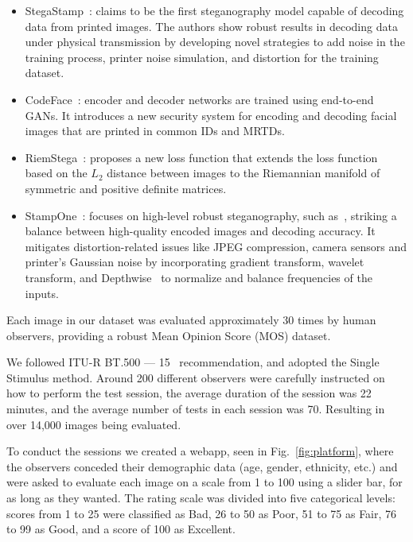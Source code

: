 \begin{itemize}
    \item StegaStamp~\cite{stegastamp2020}: claims to be the first steganography model capable of decoding data from printed images. The authors show robust results in decoding data under physical transmission by developing novel strategies to add noise in the training process, printer noise simulation, and distortion for the training dataset.
    \item CodeFace~\cite{codeface2021}: encoder and decoder networks are trained using end-to-end GANs. It introduces a new security system for encoding and decoding facial images that are printed in common IDs and MRTDs.
    \item RiemStega~\cite{cruz2025riemstega}: proposes a new loss function that extends the loss function based on the $L_2$ distance between images to the Riemannian manifold of symmetric and positive definite matrices.
    \item StampOne~\cite{stampone2023}: focuses on high-level robust steganography, such as~\cite{codeface2021, stegastamp2020}, striking a balance between high-quality encoded images and decoding accuracy. It mitigates distortion-related issues like JPEG compression, camera sensors and printer's Gaussian noise by incorporating gradient transform, wavelet transform, and Depthwise~\cite{tay2022efficient} to normalize and balance frequencies of the inputs. 
\end{itemize}

Each image in our dataset was evaluated approximately 30 times by human observers, providing a robust Mean Opinion Score (MOS) dataset.

We followed ITU-R BT.500 --- 15~\cite{ITU-R-BT500} recommendation, and adopted the Single Stimulus method. Around 200 different observers were carefully instructed on how to perform the test session, the average duration of the session was 22 minutes, and the average number of tests in each session was 70. Resulting in over 14,000 images being evaluated.

To conduct the sessions we created a webapp, seen in Fig.~\ref{fig:platform}, where the observers conceded their demographic data (age, gender, ethnicity, etc.) and were asked to evaluate each image on a scale from 1 to 100 using a slider bar, for as long as they wanted. The rating scale was divided into five categorical levels: scores from 1 to 25 were classified as Bad, 26 to 50 as Poor, 51 to 75 as Fair, 76 to 99 as Good, and a score of 100 as Excellent.

